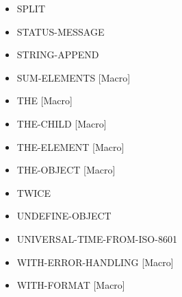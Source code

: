 \documentclass [11pt]{book}
\begin{document}
\begin{itemize}
\item {}SPLIT





\item {}STATUS-MESSAGE





\item {}STRING-APPEND





\item {}SUM-ELEMENTS [Macro]





\item {}THE [Macro]





\item {}THE-CHILD [Macro]





\item {}THE-ELEMENT [Macro]





\item {}THE-OBJECT [Macro]





\item {}TWICE





\item {}UNDEFINE-OBJECT





\item {}UNIVERSAL-TIME-FROM-ISO-8601





\item {}WITH-ERROR-HANDLING [Macro]





\item {}WITH-FORMAT [Macro]






\end{itemize}
\end{document}
